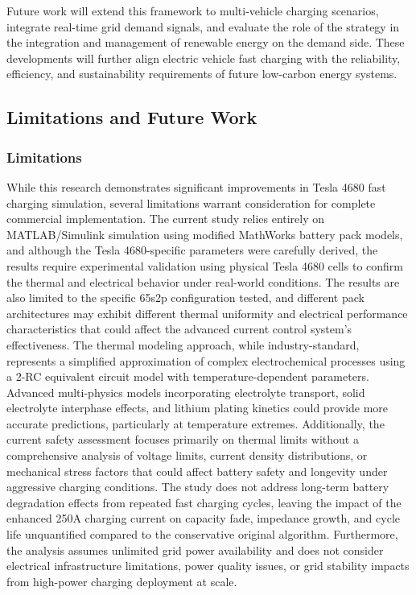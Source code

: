 \documentclass[conference]{IEEEtran}
\begin{document}
Future work will extend this framework to multi-vehicle charging scenarios, integrate real-time grid demand signals, and evaluate the role of the strategy in the integration and management of renewable energy on the demand side. These developments will further align electric vehicle fast charging with the reliability, efficiency, and sustainability requirements of future low-carbon energy systems.

\subsection{\textbf{Limitations and Future Work}}
\subsubsection{Limitations}
While this research demonstrates significant improvements in Tesla 4680 fast charging simulation, several limitations warrant consideration for complete commercial implementation. The current study relies entirely on MATLAB/Simulink simulation using modified MathWorks battery pack models, and although the Tesla 4680-specific parameters were carefully derived, the results require experimental validation using physical Tesla 4680 cells to confirm the thermal and electrical behavior under real-world conditions. The results are also limited to the specific 65s2p configuration tested, and different pack architectures may exhibit different thermal uniformity and electrical performance characteristics that could affect the advanced current control system's effectiveness.
The thermal modeling approach, while industry-standard, represents a simplified approximation of complex electrochemical processes using a 2-RC equivalent circuit model with temperature-dependent parameters. Advanced multi-physics models incorporating electrolyte transport, solid electrolyte interphase effects, and lithium plating kinetics could provide more accurate predictions, particularly at temperature extremes. Additionally, the current safety assessment focuses primarily on thermal limits without a comprehensive analysis of voltage limits, current density distributions, or mechanical stress factors that could affect battery safety and longevity under aggressive charging conditions.
The study does not address long-term battery degradation effects from repeated fast charging cycles, leaving the impact of the enhanced 250A charging current on capacity fade, impedance growth, and cycle life unquantified compared to the conservative original algorithm. Furthermore, the analysis assumes unlimited grid power availability and does not consider electrical infrastructure limitations, power quality issues, or grid stability impacts from high-power charging deployment at scale.
\end{document}
